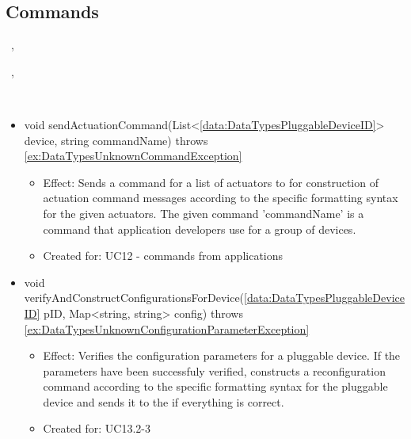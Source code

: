   \subsection{Commands}\label{int:OnlineServiceOnlineServiceApplicationManagerDeviceCommandConstructorCommands}
    \begin{description}
      \item[Provided by:] \iconcomponent{}~, \iconcomponent{}~
      \item[Required by:] \iconcomponent{}~, \iconcomponent{}~
      \item[Operations:] ~
    \begin{itemize}[noitemsep,nolistsep,leftmargin=-.25cm]
      \item \textsf{void sendActuationCommand(List\textless{}\ref{data:DataTypesPluggableDeviceID}\textgreater{} device, string commandName) throws \ref{ex:DataTypesUnknownCommandException}}
        \begin{itemize}[noitemsep,nolistsep]
           \item Effect: Sends a command for a list of actuators to  for construction of actuation command messages according to the specific formatting syntax for the given actuators. The given command 'commandName' is a command that application developers use for a group of devices.
\item Created for: UC12 - commands from applications
        \end{itemize}
      \item \textsf{void verifyAndConstructConfigurationsForDevice(\ref{data:DataTypesPluggableDeviceID} pID, Map\textless{}string, string\textgreater{} config) throws \ref{ex:DataTypesUnknownConfigurationParameterException}}
        \begin{itemize}[noitemsep,nolistsep]
           \item Effect: Verifies the configuration parameters for a pluggable device. If the parameters have been successfuly verified, constructs a reconfiguration command according to the specific formatting syntax for the pluggable device and sends it to the  if everything is correct.
\item Created for: UC13.2-3
        \end{itemize}
    \end{itemize}
    \end{description}

